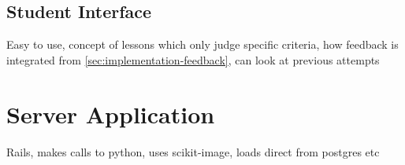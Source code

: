 \subsection{Student Interface}

Easy to use, concept of lessons which only judge specific criteria, how feedback is integrated from \cref{sec:implementation-feedback}, can look at previous attempts

\section{Server Application}
Rails, makes calls to python, uses scikit-image, loads direct from postgres etc